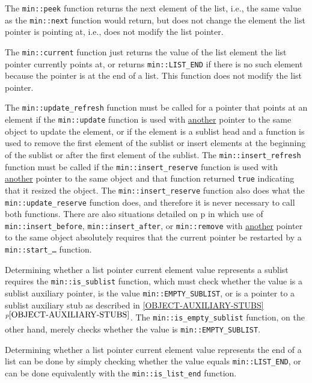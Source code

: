 \documentclass[12pt]{article}
\newcommand{\itemref}[1]{\ref{#1}$^{p\pageref{#1}}$}
\newcommand{\pagref}[1]{p\pageref{#1}}
\newcommand{\EOL}{\penalty \exhyphenpenalty}
\begin{document}
The {\tt min::\EOL peek} function returns the next element of the
list, i.e., the
same value as the {\tt min::\EOL next} function would return, but does not
change the element the list pointer is pointing at, i.e., does not
modify the list pointer.

The {\tt min::current} function just returns the value of the list
element the list pointer currently points at, or returns
{\tt min::\EOL LIST\_\EOL END}
if there is no such element because the pointer is at the end of a list.
This function does not modify the list pointer.

The {\tt min::update\_\EOL refresh}
function must be called for
a pointer that points at an element if the {\tt min::\EOL update} function
is used with \underline{another} pointer to the same object to update
the element, or if the element is a sublist head and a function is used
to remove the first element of the sublist or insert elements at the
beginning of the sublist or after the first element of the sublist.
The {\tt min::\EOL insert\_\EOL refresh} function must be called if the
{\tt min::\EOL insert\_\EOL reserve} function is used with \underline{another}
pointer to the same object and that function returned \verb|true| indicating
that it resized the object.  The 
{\tt min::\EOL insert\_\EOL reserve} function also does what the
{\tt min::\EOL update\_\EOL reserve} function does, and therefore it is
never necessary to call both functions.
There are also situations detailed on \pagref{RESTARTING_LIST_PTR}
in which use of {\tt min::\EOL insert\_\EOL before},
{\tt min::\EOL insert\_\EOL after}, or
{\tt min::\EOL remove} with \underline{another} pointer to the same object
absolutely requires that the current pointer be
restarted by a {\tt min::\EOL start\_\ldots} function.

Determining whether a list pointer current element value
represents a sublist requires
the {\tt min::\EOL is\_\EOL sublist} function, which must check whether the
value is a sublist auxiliary pointer,
is the value {\tt min::\EOL EMPTY\_\EOL SUBLIST},
or is a pointer to a sublist auxiliary stub as described in
\itemref{OBJECT-AUXILIARY-STUBS}.
The {\tt min::\EOL is\_\EOL empty\_\EOL sublist}
function, on the other hand, merely checks whether the value is
{\tt min::\EOL EMPTY\_\EOL SUBLIST}.

Determining whether a list pointer current element value
represents the end of a list can be done by
simply checking whether the value equals {\tt min::\EOL LIST\_\EOL END},
or can be done equivalently
with the {\tt min::\EOL is\_\EOL list\_\EOL end} function.
\end{document}
